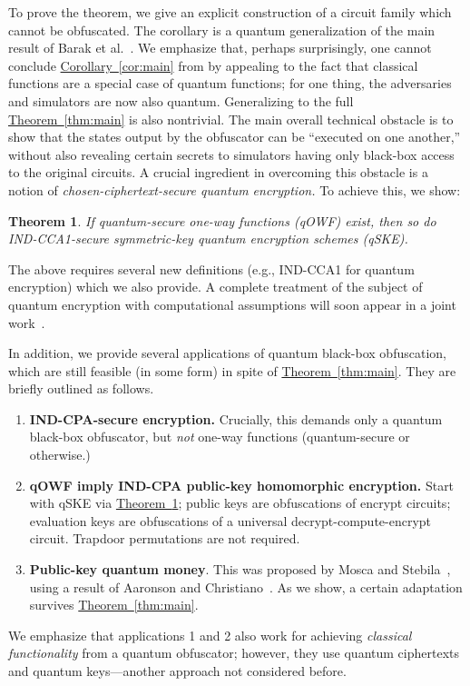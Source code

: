 \documentclass[11pt]{amsart}
\numberwithin{equation}{section}
\newtheorem{theorem}{Theorem}
\newcommand{\expref}[2]{\texorpdfstring{\hyperref[#2]{#1~\ref{#2}}}{#1~\ref{#2}}}
\begin{document}
\noindent To prove the theorem, we give an explicit construction of a circuit family which cannot be obfuscated. The corollary is a quantum generalization of the main result of Barak et al.~\cite{BGIRSVY01}. We emphasize that, perhaps surprisingly, one cannot conclude \expref{Corollary}{cor:main} from \cite{BGIRSVY01} by appealing to the fact that classical functions are a special case of quantum functions; for one thing, the adversaries and simulators are now also quantum. Generalizing to the full \expref{Theorem}{thm:main} is also nontrivial. The main overall technical obstacle is to show that the states output by the obfuscator can be ``executed on one another,'' without also revealing certain secrets to simulators having only black-box access to the original circuits. A crucial ingredient in overcoming this obstacle is a notion of \emph{chosen-ciphertext-secure quantum encryption.} To achieve this, we show:

\begin{theorem}\label{thm:cca}
If quantum-secure one-way functions (qOWF) exist, then so do IND-CCA1-secure symmetric-key quantum encryption schemes (qSKE).
\end{theorem}

\noindent The above requires several new definitions (e.g., IND-CCA1 for quantum encryption) which we also provide. A complete treatment of the subject of quantum encryption with computational assumptions will soon appear in a joint work~\cite{ABFGSS15}.

In addition, we provide several applications of quantum black-box obfuscation, which are still feasible (in some form) in spite of \expref{Theorem}{thm:main}. They are briefly outlined as follows.
\begin{enumerate}
\item \textbf{IND-CPA-secure encryption.} Crucially, this demands only a quantum black-box obfuscator, but \emph{not} one-way functions (quantum-secure or otherwise.)
\item \textbf{qOWF imply IND-CPA public-key homomorphic encryption.} Start with qSKE via \expref{Theorem}{thm:cca}; public keys are obfuscations of encrypt circuits; evaluation keys are obfuscations of a universal decrypt-compute-encrypt circuit. Trapdoor permutations are not required.
\item \textbf{Public-key quantum money}. This was proposed by Mosca and Stebila~\cite{MS10}, using a result of Aaronson and Christiano~\cite{Aar09, AC12}. As we show, a certain adaptation survives \expref{Theorem}{thm:main}.
\end{enumerate}
\noindent We emphasize that applications 1 and 2 also work for achieving \emph{classical functionality} from a quantum obfuscator; however, they use quantum ciphertexts and quantum keys---another approach not considered before.
\end{document}
